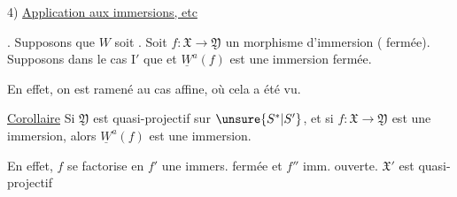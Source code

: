 4) \uline{Application aux immersions, etc}

. Supposons que $W$ soit
.
Soit $f:\mathfrak X\to\mathfrak Y$ un morphisme d'immersion
( fermée).
Supposons  
dans le cas $\mathrm I'$ que
et $\underline W^a(f)$  est une immersion fermée.

En effet, on est ramené au cas affine, où cela a été vu.

\uline{Corollaire}
Si $\mathfrak Y$ est quasi-projectif sur $\unsure{S^*|S'}$,
et si $f:\mathfrak X\to\mathfrak Y$ est une immersion,
alors $\underline W^a(f)$ est une immersion.

En effet, $f$ se factorise en
 $f'$ une immers. fermée et $f''$ imm.
ouverte. $\mathfrak X'$ est quasi-projectif 
